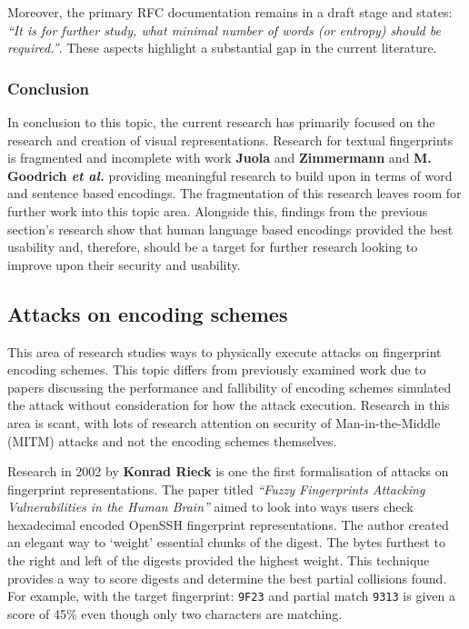 Moreover, the primary RFC documentation remains in a draft stage and states: \textit{``It is for further study, what minimal number of words (or entropy) should be required.''}. These aspects highlight a substantial gap in the current literature.

\subsubsection*{Conclusion}

In conclusion to this topic, the current research has primarily focused on the research and creation of visual representations. Research for textual fingerprints is fragmented and incomplete with work \textbf{Juola} and \textbf{Zimmermann} 
\cite{juola1996whole} and \textbf{M. Goodrich \textit{et al.}}\cite{goodrich2006loud} providing meaningful research to build upon in terms of word and sentence based encodings. The fragmentation of this research leaves room for further work into this topic area. Alongside this, findings from the previous section's research show that human language based encodings provided the best usability and, therefore, should be a target for further research looking to improve upon their security and usability.

\subsection{Attacks on encoding schemes}
This area of research studies ways to physically execute attacks on fingerprint encoding schemes. This topic differs from previously examined work due to papers discussing the performance and fallibility of encoding schemes simulated the attack without consideration for how the attack execution. Research in this area is scant, with lots of research attention on security of Man-in-the-Middle (MITM) attacks and not the encoding schemes themselves.

Research in 2002 by \textbf{Konrad Rieck}\cite{rieck2002fuzzy} is one the first formalisation of attacks on fingerprint representations. The paper titled \textit{``Fuzzy Fingerprints Attacking Vulnerabilities in the Human Brain''} aimed to look into ways users check hexadecimal encoded OpenSSH fingerprint representations. The author created an elegant way to `weight' essential chunks of the digest. The bytes furthest to the right and left of the digests provided the highest weight. This technique provides a way to score digests and determine the best partial collisions found. For example, with the target fingerprint: \verb|9F23| and partial match \verb|9313| is given a score of 45\% even though only two characters are matching.

